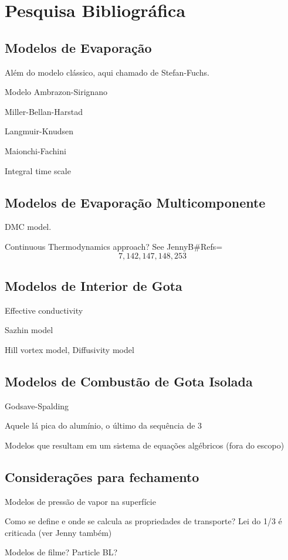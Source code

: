 \section{Pesquisa Bibliográfica}

\subsection{Modelos de Evaporação}

Além do modelo clássico, aqui chamado de Stefan-Fuchs.

Modelo Ambrazon-Sirignano

Miller-Bellan-Harstad 

Langmuir-Knudsen

Maionchi-Fachini

Integral time scale


\subsection{Modelos de Evaporação Multicomponente}

DMC model.

Continuous Thermodynamics approach? See JennyB\#Refs=\[7, 142, 147, 148, 253\]

\subsection{Modelos de Interior de Gota}

Effective conductivity

Sazhin model

Hill vortex model, Diffusivity model

\subsection{Modelos de Combustão de Gota Isolada}

Godsave-Spalding

Aquele lá pica do alumínio, o último da sequência de 3

Modelos que resultam em um sistema de equações algébricos (fora do escopo)

\subsection{Considerações para fechamento}

Modelos de pressão de vapor na superfície

Como se define e onde se calcula as propriedades de transporte? Lei do 1/3 é criticada (ver Jenny também)

Modelos de filme? Particle BL?